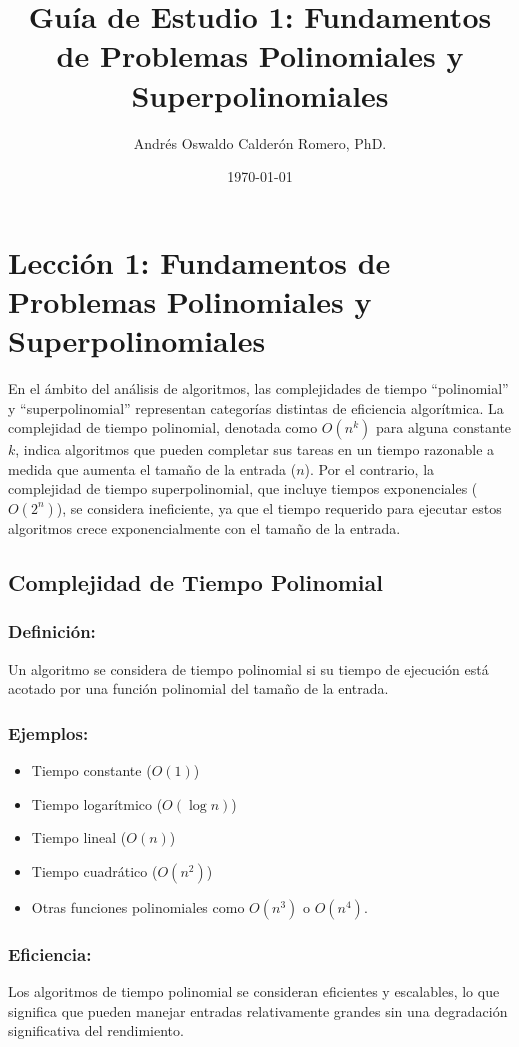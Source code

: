 \documentclass[12pt]{article}
\title{Guía de Estudio 1: Fundamentos de Problemas Polinomiales y Superpolinomiales}
\author{Andrés Oswaldo Calderón Romero, PhD.}
\date{\today}
\begin{document}
    \maketitle

    \section{Lección 1: Fundamentos de Problemas Polinomiales y Superpolinomiales}

    En el ámbito del análisis de algoritmos, las complejidades de tiempo ``polinomial'' y ``superpolinomial'' representan categorías distintas de eficiencia algorítmica. La complejidad de tiempo polinomial, denotada como $O(n^k)$ para alguna constante $k$, indica algoritmos que pueden completar sus tareas en un tiempo razonable a medida que aumenta el tamaño de la entrada ($n$). Por el contrario, la complejidad de tiempo superpolinomial, que incluye tiempos exponenciales ($O(2^n)$), se considera ineficiente, ya que el tiempo requerido para ejecutar estos algoritmos crece exponencialmente con el tamaño de la entrada.

    \subsection{Complejidad de Tiempo Polinomial}

    \subsubsection{Definición:}
    Un algoritmo se considera de tiempo polinomial si su tiempo de ejecución está acotado por una función polinomial del tamaño de la entrada.

    \subsubsection{Ejemplos:}
    \begin{itemize}
        \item Tiempo constante ($O(1)$)
        \item Tiempo logarítmico ($O(\log n)$)
        \item Tiempo lineal ($O(n)$)
        \item Tiempo cuadrático ($O(n^2)$)
        \item Otras funciones polinomiales como $O(n^3)$ o $O(n^4)$.
    \end{itemize}

    \subsubsection{Eficiencia:}
    Los algoritmos de tiempo polinomial se consideran eficientes y escalables, lo que significa que pueden manejar entradas relativamente grandes sin una degradación significativa del rendimiento.
\end{document}
